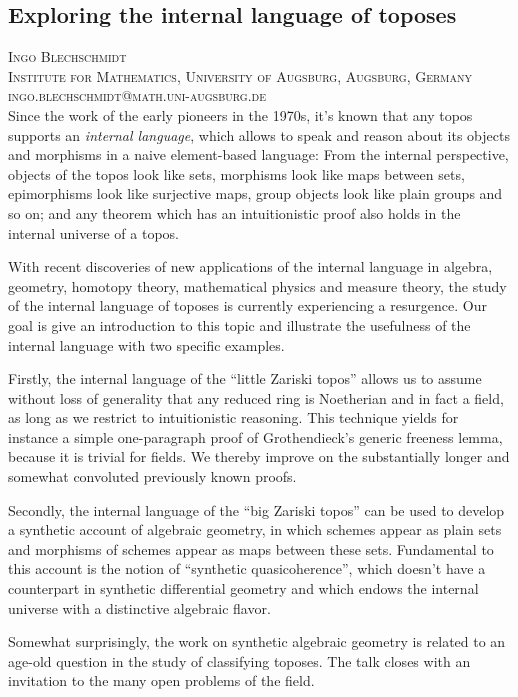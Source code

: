 \documentclass{article}
\begin{document}
\subsection*{Exploring the internal language of toposes}

\noindent
{\scshape Ingo Blechschmidt}\\
{\scshape Institute for Mathematics,
University of Augsburg, Augsburg, Germany}\\
{\scshape ingo.blechschmidt@math.uni-augsburg.de}\\

Since the work of the early pioneers in the 1970s, it's known that any topos
supports an \emph{internal language}, which allows to speak and reason about
its objects and morphisms in a naive element-based language: From the internal
perspective, objects of the topos look like sets, morphisms look like maps
between sets, epimorphisms look like surjective maps, group objects look like
plain groups and so on; and any theorem which has an intuitionistic proof also
holds in the internal universe of a topos.

With recent discoveries of new applications of the internal language in
algebra, geometry, homotopy theory, mathematical physics and measure theory,
the study of the internal language of toposes is currently experiencing a
resurgence. Our goal is give an introduction to this topic and illustrate the
usefulness of the internal language with two specific examples.

Firstly, the internal language of the ``little Zariski topos'' allows us to
assume without loss of generality that any reduced ring is Noetherian and in
fact a field, as long as we restrict to intuitionistic reasoning. This
technique yields for instance a simple one-paragraph proof of
Grothendieck's generic freeness lemma, because it is trivial for fields. We
thereby improve on the substantially longer and somewhat convoluted previously known proofs.

Secondly, the internal language of the ``big Zariski topos'' can be used to
develop a synthetic account of algebraic geometry, in which schemes appear as
plain sets and morphisms of schemes appear as maps between these sets.
Fundamental to this account is the notion of ``synthetic quasicoherence'',
which doesn't have a counterpart in synthetic differential geometry and which
endows the internal universe with a distinctive algebraic flavor.

Somewhat surprisingly, the work on synthetic algebraic geometry is related to
an age-old question in the study of classifying toposes. The talk closes with
an invitation to the many open problems of the field.
\end{document}
